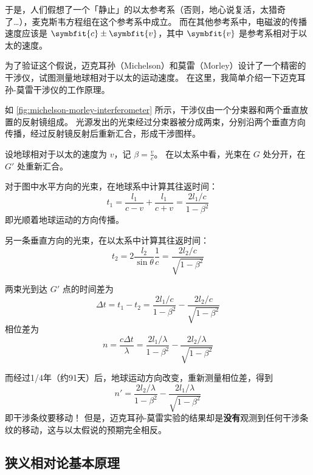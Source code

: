 于是，人们假想了一个「静止」的以太参考系（否则，地心说复活，太猎奇了\ldots），麦克斯韦方程组在这个参考系中成立。
而在其他参考系中，电磁波的传播速度应该是 $ \symbfit{c} \pm \symbfit{v} $，其中 $ \symbfit{v} $ 是参考系相对于以太的速度。

为了验证这个假说，迈克耳孙（Michelson）和莫雷（Morley）设计了一个精密的干涉仪，试图测量地球相对于以太的运动速度。
在这里，我简单介绍一下迈克耳孙-莫雷干涉仪的工作原理。


如 \cref{fig:michelson-morley-interferometer} 所示，干涉仪由一个分束器和两个垂直放置的反射镜组成。
光源发出的光束经过分束器被分成两束，分别沿两个垂直方向传播，经过反射镜反射后重新汇合，形成干涉图样。

设地球相对于以太的速度为 $v$，记 $\beta = \frac{v}{c}$。
在以太系中看，光束在 $G$ 处分开，在 $G'$ 处重新汇合。

对于图中水平方向的光束，在地球系中计算其往返时间：
\begin{equation}
    t_1 = \frac{l_1}{c - v} + \frac{l_1}{c + v} = \frac{2 l_1 / c}{1 - \beta^2}
\end{equation}
即光顺着地球运动的方向传播。

另一条垂直方向的光束，在以太系中计算其往返时间：
\begin{equation}
    t_2 = 2 \frac{l_2}{\sin \theta} \frac{1}{c} = \frac{2 l_2 / c}{\sqrt{1 - \beta^2}}
\end{equation}

两束光到达 $G'$ 点的时间差为
\begin{equation}
    \Delta t = t_1 - t_2 = \frac{2 l_1 / c}{1 - \beta^2} - \frac{2 l_2 / c}{\sqrt{1 - \beta^2}}
\end{equation}
相位差为
\begin{equation}
    n = \frac{c \Delta t}{\lambda} = \frac{2 l_1 / \lambda}{1 - \beta^2} - \frac{2 l_2 / \lambda}{\sqrt{1 - \beta^2}}
\end{equation}

而经过1/4年（约91天）后，地球运动方向改变，重新测量相位差，得到
\begin{equation}
    n' = \frac{2 l_2 / \lambda}{1 - \beta^2} - \frac{2 l_1 / \lambda}{\sqrt{1 - \beta^2}}
\end{equation}
即干涉条纹要移动！
但是，迈克耳孙-莫雷实验的结果却是\textbf{没有}观测到任何干涉条纹的移动，这与以太假说的预期完全相反。

\subsection{狭义相对论基本原理}

